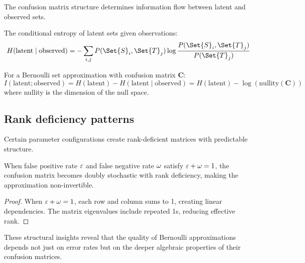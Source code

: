 \documentclass[ ../main.tex]{subfiles}
\begin{document}
The confusion matrix structure determines information flow between latent and observed sets.

\begin{definition}
The conditional entropy of latent sets given observations:
\begin{equation}
H(\text{latent} \mid \text{observed}) = -\sum_{i,j} P(\Set{S}_i, \Set{T}_j) \log \frac{P(\Set{S}_i, \Set{T}_j)}{P(\Set{T}_j)}
\end{equation}
\end{definition}

\begin{theorem}
\label{thm:info_preserve}
For a Bernoulli set approximation with confusion matrix $\mathbf{C}$:
\begin{equation}
I(\text{latent}; \text{observed}) = H(\text{latent}) - H(\text{latent} \mid \text{observed}) = H(\text{latent}) - \log(\text{nullity}(\mathbf{C}))
\end{equation}
where nullity is the dimension of the null space.
\end{theorem}

\subsection{Rank deficiency patterns}

Certain parameter configurations create rank-deficient matrices with predictable structure.

\begin{theorem}
When false positive rate $\varepsilon$ and false negative rate $\omega$ satisfy $\varepsilon + \omega = 1$, the confusion matrix becomes doubly stochastic with rank deficiency, making the approximation non-invertible.
\end{theorem}

\begin{proof}
When $\varepsilon + \omega = 1$, each row and column sums to 1, creating linear dependencies. The matrix eigenvalues include repeated 1s, reducing effective rank.
\end{proof}

These structural insights reveal that the quality of Bernoulli approximations depends not just on error rates but on the deeper algebraic properties of their confusion matrices.
\end{document}
